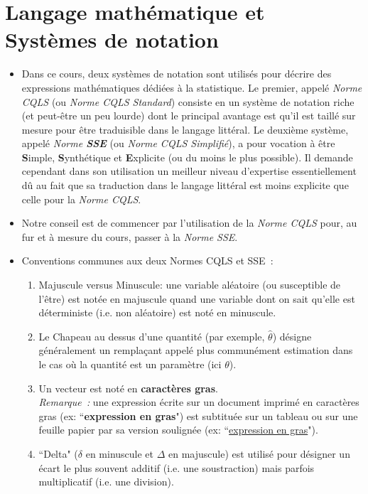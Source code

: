 \documentclass[10pt]{article}
\begin{document}
\section{Langage mathématique et Systèmes de notation}
\begin{itemize}
\item Dans ce cours, deux systèmes de notation sont utilisés pour décrire des expressions mathématiques dédiées à la statistique. Le premier, appelé \textit{Norme CQLS} (ou \textit{Norme CQLS Standard}) consiste en un système de notation riche (et peut-être un peu lourde) dont le principal avantage est qu'il est taillé sur mesure pour être traduisible dans le langage littéral. Le deuxième système, appelé  \textit{Norme \textbf{SSE}} (ou \textit{Norme CQLS Simplifié}), a pour vocation à être \textbf{S}imple, \textbf{S}ynthétique et \textbf{E}xplicite (ou du moins le plus possible). Il demande cependant dans son utilisation un meilleur niveau d'expertise essentiellement dû au fait que sa traduction dans le langage littéral est moins explicite que celle pour la \textit{Norme CQLS}. 
\item Notre conseil est de commencer par l'utilisation de la \textit{Norme CQLS} pour, au fur et à mesure du cours, passer à la \textit{Norme SSE}.
\item Conventions communes aux deux Normes CQLS et SSE~:  
\begin{enumerate}
\item Majuscule versus Minuscule: une variable aléatoire (ou susceptible de l'être) est notée en majuscule quand une variable dont on sait qu'elle est déterministe (i.e. non aléatoire) est noté en minuscule.
\item Le Chapeau au dessus d'une quantité (par exemple, $\widehat{\theta}$) désigne généralement un remplaçant appelé plus communément estimation dans le cas où la quantité est un paramètre (ici $\theta$).
\item Un vecteur est noté en \textbf{caractères gras}.\\
\textit{Remarque~:} une expression écrite sur un document imprimé en caractères gras (ex: ``\textbf{expression en gras}") est subtituée sur un tableau ou sur une feuille papier par sa version soulignée (ex: ``\underline{expression en gras}"). 
\item ``Delta" ($\delta$ en minuscule et $\Delta$ en majuscule) est utilisé pour désigner un écart le plus souvent additif (i.e. une soustraction) mais parfois multiplicatif (i.e. une division). 
\end{enumerate}

\end{itemize}
\end{document}
